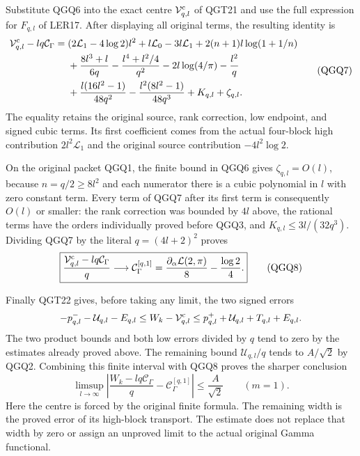 \documentclass[11pt,a4paper]{article}
\begin{document}
Substitute QGQ6 into the exact centre $\mathcal V^{\rm c}_{q,l}$
of QGT21 and use the full expression for $F_{q,l}$ of LER17.
After displaying all original terms, the resulting identity is
\[
\begin{split}
 \mathcal V^{\rm c}_{q,l}-lq\mathcal C_\Gamma
 ={}&(2\mathcal L_1-4\log2)l^2
       +l\mathcal L_0-3l\mathcal L_1
       +2(n+1)l\log(1+1/n)\\
 &+\frac{8l^3+l}{6q}-\frac{l^4+l^2/4}{q^2}
       -2l\log(4/\pi)-\frac{l^2}{q}\\
 &+\frac{l(16l^2-1)}{48q^2}
       -\frac{l^2(8l^2-1)}{48q^3}+K_{q,l}+\zeta_{q,l}.
\end{split}
 \tag{QGQ7}
\]
The equality retains the original source, rank correction, low endpoint,
and signed cubic terms. Its first coefficient comes from the actual
four-block high contribution $2l^2\mathcal L_1$ and the original
source contribution $-4l^2\log2$.

On the original packet QGQ1, the finite bound in QGQ6 gives
$\zeta_{q,l}=O(l)$, because $n=q/2\ge8l^2$ and each numerator
there is a cubic polynomial in $l$ with zero constant term.
Every term of QGQ7 after its first term is consequently $O(l)$
or smaller: the rank correction was bounded by $4l$ above, the
rational terms have the orders individually proved before QGQ3,
and $K_{q,l}\le3l/(32q^3)$. Dividing QGQ7 by the literal
$q=(4l+2)^2$ proves
\[
 \boxed{\displaystyle
 \frac{\mathcal V^{\rm c}_{q,l}-lq\mathcal C_\Gamma}{q}
             \longrightarrow\mathcal C_\Gamma^{[q,1]}
             =\frac{\partial_\alpha\mathcal L(2,\pi)}8
                                  -\frac{\log2}{4}.}
 \tag{QGQ8}
\]

Finally QGT22 gives, before taking any limit, the two signed errors
\[
 -p^-_{q,l}-\mathcal U_{q,l}-E_{q,l}
 \le W_k-\mathcal V^{\rm c}_{q,l}
 \le p^+_{q,l}+\mathcal U_{q,l}+T_{q,l}+E_{q,l}.
\]
The two product bounds and both low errors divided by $q$ tend to
zero by the estimates already proved above. The remaining bound
$\mathcal U_{q,l}/q$ tends to $A/\sqrt2$ by QGQ2.
Combining this finite interval with QGQ8 proves the sharper conclusion
\[
 \boxed{\displaystyle
 \limsup_{l\to\infty}
 \left|\frac{W_k-lq\mathcal C_\Gamma}{q}
                  -\mathcal C_\Gamma^{[q,1]}\right|
                           \le\frac A{\sqrt2}\qquad(m=1).}
 \tag{QGQ9}
\]
Here the centre is forced by the original finite formula. The remaining
width is the proved error of its high-block transport. The estimate
does not replace that width by zero or assign an unproved limit to
the actual original Gamma functional.
\end{document}
